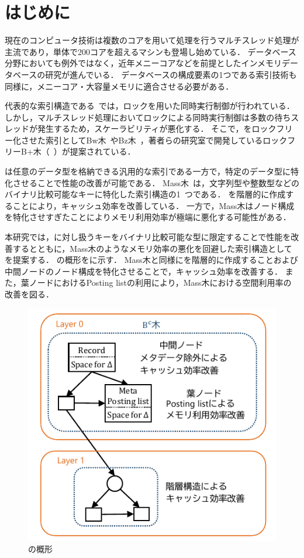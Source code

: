 
\section{はじめに}
現在のコンピュータ技術は複数のコアを用いて処理を行うマルチスレッド処理が主流であり，単体で200コアを超えるマシンも登場し始めている．
データベース分野においても例外ではなく，近年メニーコアなどを前提としたインメモリデータベースの研究が進んでいる．
データベースの構成要素の1つである索引技術も同様に，メニーコア・大容量メモリに適合させる必要がある．

代表的な索引構造である\Bptree{}~\cite{book:dbsystem}では，ロックを用いた同時実行制御が行われている．
しかし，マルチスレッド処理においてロックによる同時実行制御は多数の待ちスレッドが発生するため，スケーラビリティが悪化する．
そこで，\Bptree{}をロックフリー化させた索引としてBw木~\cite{book:Bwtree}やBz木~\cite{book:Bztree}，著者らの研究室で開発しているロックフリーB+木（\Bctree{}~\cite{deim:Hirano2024}）が提案されている．

\Bctree{}は任意のデータ型を格納できる汎用的な索引である一方で，特定のデータ型に特化させることで性能の改善が可能である．
Mass木~\cite{book:Masstree}は，文字列型や整数型などのバイナリ比較可能なキーに特化した索引構造の1~つである．
\Bptree{}を階層的に作成することにより，キャッシュ効率を改善している．
一方で，Mass木はノード構成を特化させすぎたことによりメモリ利用効率が極端に悪化する可能性がある．

本研究では，\Bctree{}に対し扱うキーをバイナリ比較可能な型に限定することで性能を改善するとともに，Mass木のようなメモリ効率の悪化を回避した索引構造として\Bcforest{}を提案する．
\Bcforest{}の概形を\Fig{\ref{fig:bcforest}}に示す．
Mass木と同様に\Bctree{}を階層的に作成することおよび中間ノードのノード構成を特化させることで，キャッシュ効率を改善する．
また，葉ノードにおけるPosting listの利用により，Mass木における空間利用率の改善を図る．

\begin{figure}[t]
    \centering
    \includegraphics{./figures/bcforest.pdf}
    \caption{\Bcforest{}の概形}
    \label{fig:bcforest}
\end{figure}

